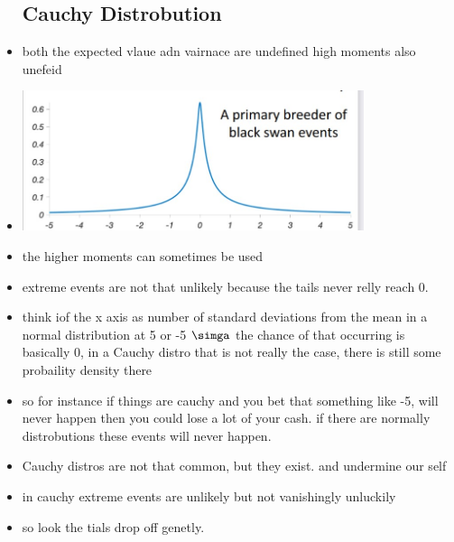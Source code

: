 \documentclass{article}
\begin{document}
\begin{itemize}
\subsection{Cauchy Distrobution }
\item both the expected vlaue adn vairnace are undefined 
high moments also unefeid
\item \includegraphics[width=10cm]{Final_Review/lecture_3/cauchy.jpg} 
\item the higher moments can sometimes be used 
\item extreme events are not that unlikely because the tails never relly reach 0. 
\item think iof the x axis as number of standard deviations from the mean
\itme in a normal distribution at 5 or -5 $\simga$ the chance of that occurring is basically 0, in a Cauchy distro that is not really the case, there is still some probaility density there 
\item so for instance if things are cauchy and you bet that something like -5, will never happen then you could lose a lot of your cash. if there are normally distrobutions these events will never happen. 
\item Cauchy distros are not that common, but they exist. and undermine our self 
\item in cauchy extreme events are unlikely but not vanishingly unluckily
\item so look the tials drop off genetly. 

\end{itemize}
\end{document}
